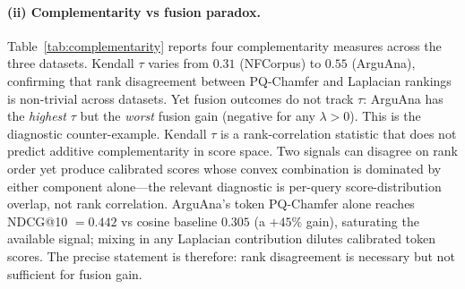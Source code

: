\documentclass[review,1p]{elsarticle}
\begin{document}
\paragraph{(ii) Complementarity vs fusion paradox.} Table~\ref{tab:complementarity} reports four complementarity measures across the three datasets. Kendall $\tau$ varies from $0.31$ (NFCorpus) to $0.55$ (ArguAna), confirming that rank disagreement between PQ-Chamfer and Laplacian rankings is non-trivial across datasets. Yet fusion outcomes do not track $\tau$: ArguAna has the \emph{highest} $\tau$ but the \emph{worst} fusion gain (negative for any $\lambda > 0$). This is the diagnostic counter-example. Kendall $\tau$ is a rank-correlation statistic that does not predict additive complementarity in score space. Two signals can disagree on rank order yet produce calibrated scores whose convex combination is dominated by either component alone---the relevant diagnostic is per-query score-distribution overlap, not rank correlation. ArguAna's token PQ-Chamfer alone reaches NDCG@10 $=0.442$ vs cosine baseline $0.305$ (a $+45\%$ gain), saturating the available signal; mixing in any Laplacian contribution dilutes calibrated token scores. The precise statement is therefore: rank disagreement is necessary but not sufficient for fusion gain.

\begin{table}[h]
\centering
\small
\caption{Component complementarity metrics across three BEIR datasets. Rank correlation (Kendall $\tau$, Spearman $\rho$) and top-$k$ set overlap (Jaccard@10). Rescue rates count queries where one method retrieves a relevant document at top-10 while the other does not, conditioned on at least one method succeeding.}
\label{tab:complementarity}
\end{table}
\end{document}
